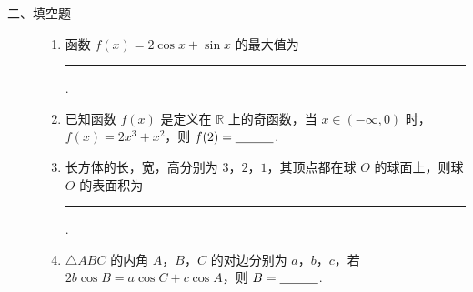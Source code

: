 \begin{description}

    \item[二、填空题]

    \begin{enumerate}[leftmargin=5pt]

      \addtocounter{enumi}{+12}

        \item 函数 \(f(x)=2\cos x+\sin x\) 的最大值为\rule[-0.3ex]{3em}{0.4pt}.

        \item 已知函数 \(f(x)\) 是定义在 \(\mathbb{R}\) 上的奇函数，当 \(x\in(-\infty,0)\) 时，\(f(x)=2x^3+x^2\)，则 \(f(2)=\rule[-0.3ex]{3em}{0.4pt}\).

        \item 长方体的长，宽，高分别为 \(3\)，\(2\)，\(1\)，其顶点都在球 \(O\) 的球面上，则球 \(O\) 的表面积为\rule[-0.3ex]{3em}{0.4pt}.

        \item \(\triangle ABC\) 的内角 \(A\)，\(B\)，\(C\) 的对边分别为 \(a\)，\(b\)，\(c\)，若 \(2b\cos B=a\cos C+c\cos A\)，则 \(B=\rule[-0.3ex]{3em}{0.4pt}\).

    \end{enumerate}

\end{description}

